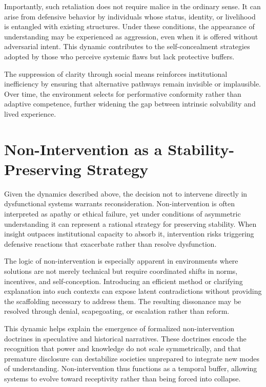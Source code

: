 \documentclass[12pt]{article}
\begin{document}
Importantly, such retaliation does not require malice in the ordinary sense. It can arise from defensive behavior by individuals whose status, identity, or livelihood is entangled with existing structures. Under these conditions, the appearance of understanding may be experienced as aggression, even when it is offered without adversarial intent. This dynamic contributes to the self-concealment strategies adopted by those who perceive systemic flaws but lack protective buffers.

The suppression of clarity through social means reinforces institutional inefficiency by ensuring that alternative pathways remain invisible or implausible. Over time, the environment selects for performative conformity rather than adaptive competence, further widening the gap between intrinsic solvability and lived experience.

\section{Non-Intervention as a Stability-Preserving Strategy}

Given the dynamics described above, the decision not to intervene directly in dysfunctional systems warrants reconsideration. Non-intervention is often interpreted as apathy or ethical failure, yet under conditions of asymmetric understanding it can represent a rational strategy for preserving stability. When insight outpaces institutional capacity to absorb it, intervention risks triggering defensive reactions that exacerbate rather than resolve dysfunction.

The logic of non-intervention is especially apparent in environments where solutions are not merely technical but require coordinated shifts in norms, incentives, and self-conception. Introducing an efficient method or clarifying explanation into such contexts can expose latent contradictions without providing the scaffolding necessary to address them. The resulting dissonance may be resolved through denial, scapegoating, or escalation rather than reform.

This dynamic helps explain the emergence of formalized non-intervention doctrines in speculative and historical narratives. These doctrines encode the recognition that power and knowledge do not scale symmetrically, and that premature disclosure can destabilize societies unprepared to integrate new modes of understanding. Non-intervention thus functions as a temporal buffer, allowing systems to evolve toward receptivity rather than being forced into collapse.
\end{document}
